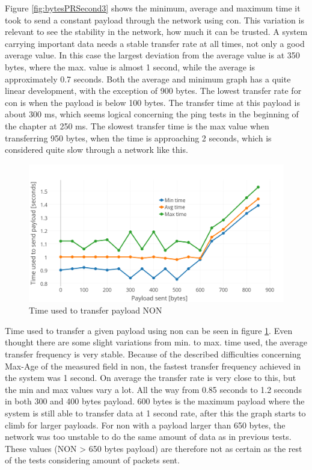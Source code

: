 \noindent Figure \ref{fig:bytesPRSecond3} shows the minimum, average and maximum time it took to send a constant payload through the network using \gls{con}. This variation is relevant to see the stability in the network, how much it can be trusted. A system carrying important data needs a stable transfer rate at all times, not only a good average value. In this case the largest deviation from the average value is at 350 bytes, where the max. value is almost 1 second, while the average is approximately 0.7 seconds. Both the average and minimum graph has a quite linear development, with the exception of 900 bytes. The lowest transfer rate for \gls{con} is when the payload is below 100 bytes. The transfer time at this payload is about 300 ms, which seems logical concerning the ping tests in the beginning of the chapter at 250 ms. The slowest transfer time is the max value when transferring 950 bytes, when the time is approaching 2 seconds, which is considered quite slow through a network like this. 


\begin{figure}[h!]
    \centering
    \includegraphics[width=1.0\textwidth]{bytesPrSecondNewNON.png}    
    \caption{Time used to transfer payload NON}
    \label{fig:bytesPRSecond4}
\end{figure}

\noindent Time used to transfer a given payload using \gls{non} can be seen in figure \ref{fig:bytesPRSecond4}. Even thought there are some slight variations from min. to max. time used, the average transfer frequency is very stable. Because of the described difficulties concerning Max-Age of the measured field in \gls{non}, the fastest transfer frequency achieved in the system was 1 second. On average the transfer rate is very close to this, but the min and max values vary a lot. All the way from 0.85 seconds to 1.2 seconds in both 300 and 400 bytes payload. 600 bytes is the maximum payload where the system is still able to transfer data at 1 second rate, after this the graph starts to climb for larger payloads. For \gls{non} with a payload larger than 650 bytes, the network was too unstable to do the same amount of data as in previous tests. These values (NON > 650 bytes payload) are therefore not as certain as the rest of the tests considering amount of packets sent.


